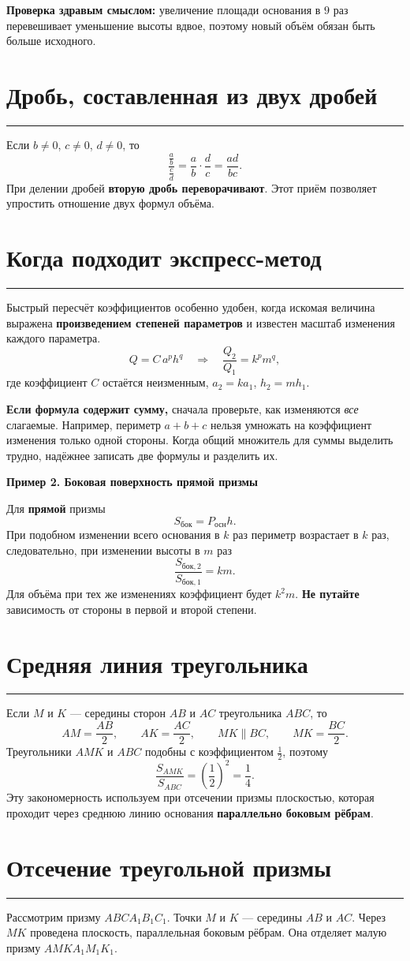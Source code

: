 \documentclass[a4paper,12pt]{article}
\newcommand{\topic}[1]{\needspace{6\baselineskip}\section{#1}\vspace{-1.5mm}\noindent\textcolor{accent}{\rule{\linewidth}{0.45pt}}\vspace{-2mm}}
\newcommand{\key}[1]{\textcolor{darkaccent}{\textbf{#1}}}
\newcommand{\ex}[1]{\par\medskip\noindent\textcolor{darkaccent}{\textbf{#1}}\par\smallskip}
\begin{document}
\key{Проверка здравым смыслом:} увеличение площади основания в $9$ раз перевешивает уменьшение высоты вдвое, поэтому новый объём обязан быть больше исходного.

\topic{Дробь, составленная из двух дробей}
Если $b\ne0$, $c\ne0$, $d\ne0$, то
\[
\frac{\frac ab}{\frac cd}=\frac ab\cdot\frac dc=\frac{ad}{bc}.
\]
При делении дробей \textbf{вторую дробь переворачивают}. Этот приём позволяет упростить отношение двух формул объёма.

\clearpage
\topic{Когда подходит экспресс-метод}
Быстрый пересчёт коэффициентов особенно удобен, когда искомая величина выражена \textbf{произведением степеней параметров} и известен масштаб изменения каждого параметра.
\[
Q=C\,a^p h^q\quad\Longrightarrow\quad
\frac{Q_2}{Q_1}=k^p m^q,
\]
где коэффициент $C$ остаётся неизменным, $a_2=ka_1$, $h_2=mh_1$.

\key{Если формула содержит сумму,} сначала проверьте, как изменяются \emph{все} слагаемые. Например, периметр $a+b+c$ нельзя умножать на коэффициент изменения только одной стороны. Когда общий множитель для суммы выделить трудно, надёжнее записать две формулы и разделить их.

\ex{Пример 2. Боковая поверхность прямой призмы}
Для \textbf{прямой} призмы
\[
\boxed{S_{\text{бок}}=P_{\text{осн}}h}.
\]
При подобном изменении всего основания в $k$ раз периметр возрастает в $k$ раз, следовательно, при изменении высоты в $m$ раз
\[
\frac{S_{\text{бок},2}}{S_{\text{бок},1}}=km.
\]
Для объёма при тех же изменениях коэффициент будет $k^2m$. \textbf{Не путайте} зависимость от стороны в первой и второй степени.

\topic{Средняя линия треугольника}
Если $M$ и $K$ --- середины сторон $AB$ и $AC$ треугольника $ABC$, то
\[
AM=\frac{AB}{2},\qquad AK=\frac{AC}{2},\qquad
MK\parallel BC,\qquad MK=\frac{BC}{2}.
\]
Треугольники $AMK$ и $ABC$ подобны с коэффициентом $\frac12$, поэтому
\[
\boxed{\frac{S_{AMK}}{S_{ABC}}=\left(\frac12\right)^2=\frac14}.
\]
Эту закономерность используем при отсечении призмы плоскостью, которая проходит через среднюю линию основания \textbf{параллельно боковым рёбрам}.

\clearpage
\topic{Отсечение треугольной призмы}
Рассмотрим призму $ABCA_1B_1C_1$. Точки $M$ и $K$ --- середины $AB$ и $AC$. Через $MK$ проведена плоскость, параллельная боковым рёбрам. Она отделяет малую призму $AMKA_1M_1K_1$.
\end{document}
